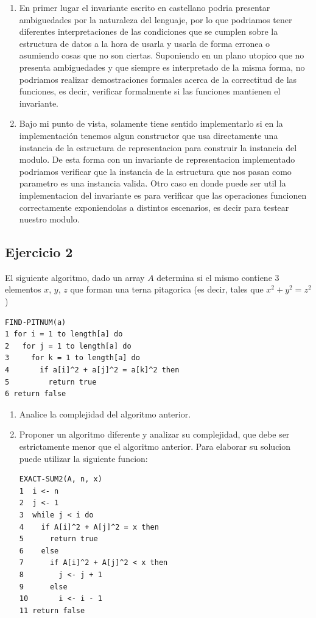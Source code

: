 \documentclass[10pt, a4paper]{report}
\begin{document}
\begin{enumerate}
 \item En primer lugar el invariante escrito en castellano podria presentar ambiguedades por la naturaleza del lenguaje, por lo que podriamos tener diferentes interpretaciones de las condiciones que se cumplen sobre la estructura de datos a la hora de usarla y usarla de forma erronea o asumiendo cosas que no son ciertas. Suponiendo en un plano utopico que no presenta ambiguedades y que siempre es interpretado de la misma forma, no podriamos realizar demostraciones formales acerca de la correctitud de las funciones, es decir, verificar formalmente si las funciones mantienen el invariante.
 
 \item Bajo mi punto de vista, solamente tiene sentido implementarlo si en la implementaci\'on tenemos algun constructor que usa directamente una instancia de la estructura de representacion para construir la instancia del modulo. De esta forma con un invariante de representacion implementado podriamos verificar que la instancia de la estructura que nos pasan como parametro es una instancia valida. Otro caso en donde puede ser util la implementacion del invariante es para verificar que las operaciones funcionen correctamente exponiendolas a distintos escenarios, es decir para testear nuestro modulo.
\end{enumerate}



\subsection*{Ejercicio 2}
El siguiente algoritmo, dado un array $A$ determina si el mismo contiene $3$ elementos $x$, $y$, $z$ que forman una terna pitagorica (es decir, tales que $x^2 + y^2 = z^2$)

\begin{verbatim}
FIND-PITNUM(a)
1 for i = 1 to length[a] do
2   for j = 1 to length[a] do
3     for k = 1 to length[a] do
4       if a[i]^2 + a[j]^2 = a[k]^2 then
5         return true
6 return false
\end{verbatim}

\begin{enumerate}
 \item Analice la complejidad del algoritmo anterior.
 \item Proponer un algoritmo diferente y analizar su complejidad, que debe ser estrictamente menor que el algoritmo anterior. Para elaborar su solucion puede utilizar la siguiente funcion:

 \begin{verbatim}
EXACT-SUM2(A, n, x)
1  i <- n
2  j <- 1
3  while j < i do
4    if A[i]^2 + A[j]^2 = x then
5      return true
6    else
7      if A[i]^2 + A[j]^2 < x then
8        j <- j + 1
9      else
10       i <- i - 1
11 return false
\end{verbatim}

\end{enumerate}
\end{document}
